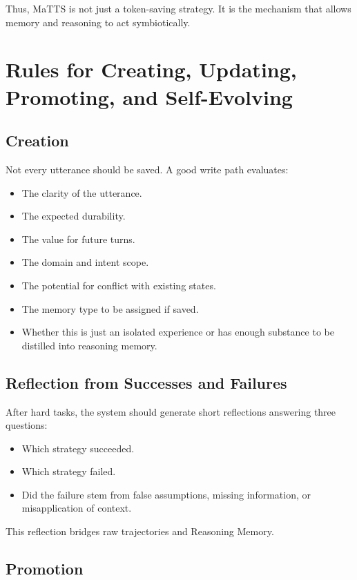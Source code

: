 \documentclass[a4paper,12pt]{article}
\begin{document}
Thus, MaTTS is not just a token-saving strategy. It is the mechanism that allows memory and reasoning to act symbiotically.

\section{Rules for Creating, Updating, Promoting, and Self-Evolving}

\subsection*{Creation}

Not every utterance should be saved. A good write path evaluates:
\begin{itemize}
    \item The clarity of the utterance.
    \item The expected durability.
    \item The value for future turns.
    \item The domain and intent scope.
    \item The potential for conflict with existing states.
    \item The memory type to be assigned if saved.
    \item Whether this is just an isolated experience or has enough substance to be distilled into reasoning memory.
\end{itemize}

\subsection*{Reflection from Successes and Failures}

After hard tasks, the system should generate short reflections answering three questions:
\begin{itemize}
    \item Which strategy succeeded.
    \item Which strategy failed.
    \item Did the failure stem from false assumptions, missing information, or misapplication of context.
\end{itemize}

This reflection bridges raw trajectories and Reasoning Memory.

\subsection*{Promotion}
\end{document}
